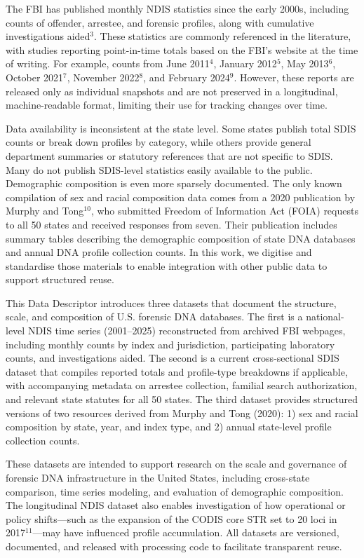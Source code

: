 \documentclass[11pt]{article}
\begin{document}
The FBI has published monthly NDIS statistics since the early 2000s, including counts of offender, arrestee, and forensic profiles, along with cumulative investigations aided$^{3}$. These statistics are commonly referenced in the literature, with studies reporting point-in-time totals based on the FBI's website at the time of writing. For example, counts from June 2011$^{4}$, January 2012$^{5}$, May 2013$^{6}$, October 2021$^{7}$, November 2022$^{8}$, and February 2024$^{9}$. However, these reports are released only as individual snapshots and are not preserved in a longitudinal, machine-readable format, limiting their use for tracking changes over time.

Data availability is inconsistent at the state level. Some states publish total SDIS counts or break down profiles by category, while others provide general department summaries or statutory references that are not specific to SDIS. Many do not publish SDIS-level statistics easily available to the public. Demographic composition is even more sparsely documented. The only known compilation of sex and racial composition data comes from a 2020 publication by Murphy and Tong$^{10}$, who submitted Freedom of Information Act (FOIA) requests to all 50 states and received responses from seven. Their publication includes summary tables describing the demographic composition of state DNA databases and annual DNA profile collection counts. In this work, we digitise and standardise those materials to enable integration with other public data to support structured reuse.

This Data Descriptor introduces three datasets that document the structure, scale, and composition of U.S. forensic DNA databases. The first is a national-level NDIS time series (2001--2025) reconstructed from archived FBI webpages, including monthly counts by index and jurisdiction, participating laboratory counts, and investigations aided. The second is a current cross-sectional SDIS dataset that compiles reported totals and profile-type breakdowns if applicable, with accompanying metadata on arrestee collection, familial search authorization, and relevant state statutes for all 50 states. The third dataset provides structured versions of two resources derived from Murphy and Tong (2020): 1) sex and racial composition by state, year, and index type, and 2) annual state-level profile collection counts.

These datasets are intended to support research on the scale and governance of forensic DNA infrastructure in the United States, including cross-state comparison, time series modeling, and evaluation of demographic composition. The longitudinal NDIS dataset also enables investigation of how operational or policy shifts---such as the expansion of the CODIS core STR set to 20 loci in 2017$^{11}$---may have influenced profile accumulation. All datasets are versioned, documented, and released with processing code to facilitate transparent reuse.
\end{document}
